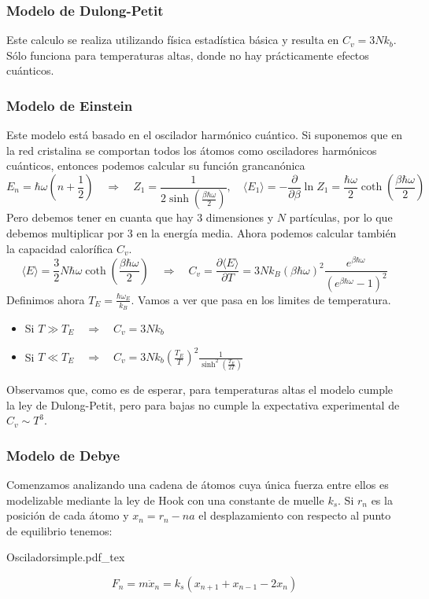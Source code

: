 \documentclass[leqno]{article}
\newcommand{\incfig}[1]{%
\center
\def\svgwidth{0.9\columnwidth}
{#1.pdf_tex}
}
\begin{document}
\subsubsection{Modelo de Dulong-Petit}
Este calculo se realiza utilizando física estadística básica y resulta en $C_v = 3Nk_b$. Sólo funciona para temperaturas altas, donde no hay prácticamente efectos cuánticos.

\subsubsection{Modelo de Einstein}
Este modelo está basado en el oscilador harmónico cuántico. Si suponemos que en la red cristalina se comportan todos los átomos como osciladores harmónicos cuánticos, entonces podemos calcular su función grancanónica
\[
  E_n = \hbar \omega (n+\frac{1}{2}) \quad \Rightarrow \quad Z_1 = \frac{1}{2 \sinh(\frac{\beta \hbar \omega }{2})}, \quad \langle E_1 \rangle = - \frac{\partial }{\partial \beta } \ln Z_1 = \frac{\hbar\omega }{2} \coth \left( \frac{\beta \hbar \omega }{2} \right) 
\] 
Pero debemos tener en cuanta que hay 3 dimensiones y $N$ partículas, por lo que debemos multiplicar por 3 en la energía media. Ahora podemos calcular también la capacidad calorífica $C_v$.
 \[
\langle E\rangle = \frac{3}{2} N \hbar \omega \coth \left( \frac{\beta \hbar \omega  }{2} \right) \quad \Rightarrow \quad
C_v = \frac{\partial \langle E\rangle}{\partial T}  = 3Nk_B (\beta \hbar \omega )^2 \frac{e^{\beta \hbar \omega }}{(e^{\beta \hbar \omega }-1)^2}
\] 
Definimos ahora $T_E = \frac{\hbar \omega_E}{k_B}$. Vamos a ver que pasa en los limites de temperatura.

\begin{itemize}[topsep=-6pt, itemsep=0pt]
  \item Si  $T\gg T_E \quad \Rightarrow \quad C_v = 3Nk_b$
  \item Si  $T\ll T_E \quad \Rightarrow \quad C_v = 3Nk_b (\frac{T_E}{T})^2 \frac{1}{\sinh ^2(\frac{T_E}{2T})}$
\end{itemize}

Observamos que, como es de esperar, para temperaturas altas el modelo cumple la ley de Dulong-Petit, pero para bajas no cumple la expectativa experimental de $C_v \sim  T^3$.


\subsubsection{Modelo de Debye}
\begin{minipage}{0.7\textwidth}
Comenzamos analizando una cadena de átomos cuya única fuerza entre ellos es modelizable mediante la ley de Hook con una constante de muelle $k_s$. Si  $r_n$ es la posición de cada átomo y $x_n = r_n-na$ el desplazamiento con respecto al punto de equilibrio tenemos:
\end{minipage}
\begin{minipage}{0.3\textwidth}
  \incfig{Osciladorsimple}
\end{minipage}
 \[
F_n =m\ddot{x}_n = k_s(x_{n+1}+x_{n-1}-2x_n)
\] 
\end{document}
